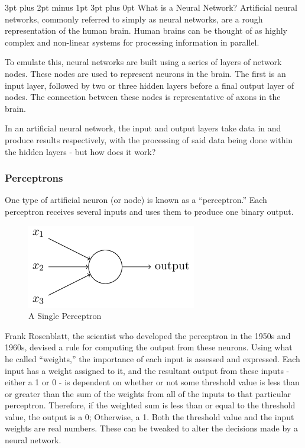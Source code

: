 \documentclass[12pt,a4paper]{article}
\makeatletter
\renewcommand\subsection{\@startsection {subsection}{1}{2mm} %
                               {3pt plus 2pt minus 1pt} %
                               {3pt plus 0pt} %
                               {\normalfont\bfseries}}
\makeatother
\begin{document}
\subsection{What is a Neural Network?}
Artificial neural networks, commonly referred to simply as neural networks, are a rough representation of the human brain. Human brains can be thought of as highly complex and non-linear systems for processing information in parallel\citep{NeuralNetworksAComprehensiveFoundation}. 

To emulate this, neural networks are built using a series of layers of network nodes. These nodes are used to represent neurons in the brain. The first is an input layer, followed by two or three hidden layers before a final output layer of nodes\citep{ArtificialNeuralNetwork}. The connection between these nodes is representative of axons in the brain. 

In an artificial neural network, the input and output layers take data in and produce results respectively, with the processing of said data being done within the hidden layers - but how does it work? 

\subsubsection{Perceptrons}
One type of artificial neuron (or node) is known as a \enquote{perceptron.} Each perceptron receives several inputs and uses them to produce one binary output\citep{NeuralNetworksAndDeepLearning}.  

\begin{figure}[h]
	\centering
	\includegraphics{Perceptron.png}
	\caption{A Single Perceptron}
\end{figure}

Frank Rosenblatt, the scientist who developed the perceptron in the 1950s and 1960s, devised a rule for computing the output from these neurons. Using what he called \enquote{weights,} the importance of each input is assessed and expressed. Each input has a weight assigned to it, and the resultant output from these inputs - either a 1 or 0 - is dependent on whether or not some threshold value is less than or greater than the sum of the weights from all of the inputs to that particular perceptron. Therefore, if the weighted sum is less than or equal to the threshold value, the output is a 0; Otherwise, a 1\citep{NeuralNetworksAndDeepLearning}. Both the threshold value and the input weights are real numbers. These can be tweaked to alter the decisions made by a neural network. 
\end{document}
